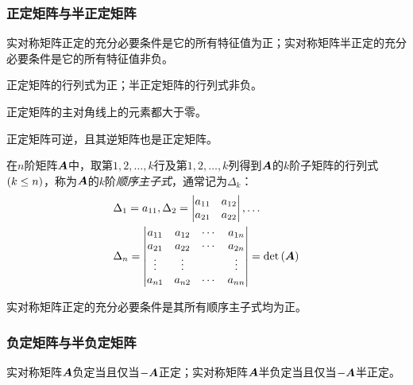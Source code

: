 \documentclass{ctexart}
\begin{document}
\subsubsection*{正定矩阵与半正定矩阵}

\begin{theorem}
    实对称矩阵正定的充分必要条件是它的所有特征值为正；实对称矩阵半正定的充分必要条件是它的所有特征值非负。
\end{theorem}

\begin{property}
    正定矩阵的行列式为正；半正定矩阵的行列式非负。
\end{property}

\begin{property}
    正定矩阵的主对角线上的元素都大于零。
\end{property}

\begin{property}
    正定矩阵可逆，且其逆矩阵也是正定矩阵。
\end{property}

\begin{definition}[顺序主子式]
    在\(n\)阶矩阵\(\mata\)中，取第\(1,2,\dots,k\)行及第\(1,2,\dots,k\)列得到\(\mata\)的\(k\)阶子矩阵的行列式\(\mypar{k\le n}\)，称为\(\mata\)的\(k\)阶\emph{顺序主子式}，通常记为\(\Delta_k\)：
    \begin{align*}
         & \Delta_1=a_{11},\Delta_2=\begin{vmatrix}
            a_{11} & a_{12} \\a_{21}&a_{22}
        \end{vmatrix},\dots \\
         & \Delta_n=\sqmat{vmatrix}{a}{n}=\det{\mata}
    \end{align*}
\end{definition}

\begin{theorem}
    实对称矩阵正定的充分必要条件是其所有顺序主子式均为正。
\end{theorem}

\subsubsection*{负定矩阵与半负定矩阵}

\begin{theorem}
    实对称矩阵\(\mata\)负定当且仅当\(-\mata\)正定；实对称矩阵\(\mata\)半负定当且仅当\(-\mata\)半正定。
\end{theorem}
\end{document}
